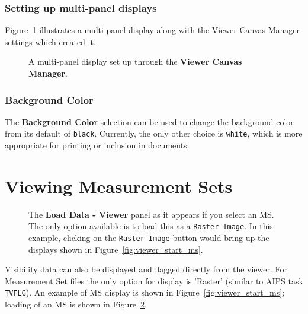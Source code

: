 \subsubsection{Setting up multi-panel displays}
\label{section:display.viewerGUI.canvas.multi}

Figure~\ref{fig:viewer_canvas} illustrates a multi-panel display along
with the Viewer Canvas Manager settings which created it. 

\begin{figure}[h!]
\begin{center}
\caption{\label{fig:viewer_canvas} A multi-panel display
set up through the {\bf Viewer Canvas Manager}.} 
\hrulefill
\end{center}
\end{figure}

\subsubsection{Background Color}
\label{section:display.viewerGUI.canvas.background}

The {\bf Background Color} selection can be used to change the
background color from its default of {\tt black}.  Currently,
the only other choice is {\tt white}, which is more appropriate
for printing or inclusion in documents.

\section{Viewing Measurement Sets}
\label{section:display.ms}

\begin{figure}[h!]
\begin{center}
\caption{\label{fig:viewer_load_ms} The {\bf Load Data - Viewer} panel
as it appears if you select an MS.  The only option available is
to load this as a {\tt Raster Image}.  In this example, clicking
on the {\tt Raster Image} button would bring up the displays shown
in Figure~\ref{fig:viewer_start_ms}.}
\hrulefill
\end{center}
\end{figure}

Visibility data can also be displayed and flagged directly from the
viewer. For Measurement Set files the only option for display is 'Raster'
(similar to AIPS task {\tt TVFLG}).  An example of MS display is
shown in Figure~\ref{fig:viewer_start_ms}; loading of an
MS is shown in Figure~\ref{fig:viewer_load_ms}.  

